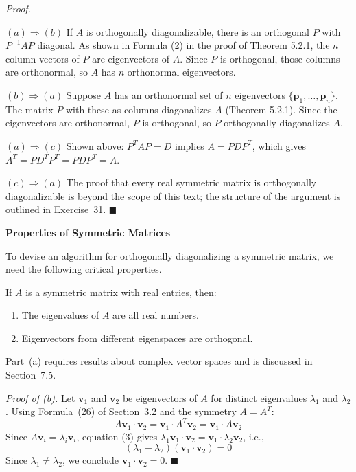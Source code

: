 \documentclass{article}
\newcommand{\redheading}[1]{{\vspace{2mm}\noindent\Large\bfseries\color{red!55!black} #1\par}\vspace{2mm}}
\theoremstyle{mystyle}
\begin{document}
\textit{Proof.}

\textbf{$(a)\Rightarrow(b)$} If $A$ is orthogonally diagonalizable, there is an orthogonal
$P$ with $P^{-1}AP$ diagonal. As shown in Formula (2) in the proof of Theorem 5.2.1, the
$n$ column vectors of $P$ are eigenvectors of $A$. Since $P$ is orthogonal, those columns
are orthonormal, so $A$ has $n$ orthonormal eigenvectors.

\textbf{$(b)\Rightarrow(a)$} Suppose $A$ has an orthonormal set of $n$ eigenvectors
$\{\mathbf{p}_1,\ldots,\mathbf{p}_n\}$. The matrix $P$ with these as columns diagonalizes
$A$ (Theorem 5.2.1). Since the eigenvectors are orthonormal, $P$ is orthogonal, so $P$
orthogonally diagonalizes $A$.

\textbf{$(a)\Rightarrow(c)$} Shown above: $P^T AP = D$ implies $A = PDP^T$, which gives
$A^T = PD^TP^T = PDP^T = A$.

\textbf{$(c)\Rightarrow(a)$} The proof that every real symmetric matrix is orthogonally
diagonalizable is beyond the scope of this text; the structure of the argument is outlined
in Exercise~31. $\blacksquare$

\redheading{Properties of Symmetric Matrices}

To devise an algorithm for orthogonally diagonalizing a symmetric matrix, we need the
following critical properties.

\begin{tcolorbox}[colback=red!4, colframe=red!60!black,
  title={\textbf{Theorem 7.2.2}}, boxrule=0.5mm, arc=3mm]
If $A$ is a symmetric matrix with real entries, then:
\begin{enumerate}
  \item[(a)] The eigenvalues of $A$ are all real numbers.
  \item[(b)] Eigenvectors from different eigenspaces are orthogonal.
\end{enumerate}
\end{tcolorbox}

Part~(a) requires results about complex vector spaces and is discussed in Section~7.5.

\textit{Proof of (b).} Let $\mathbf{v}_1$ and $\mathbf{v}_2$ be eigenvectors of $A$
for distinct eigenvalues $\lambda_1$ and $\lambda_2$. Using Formula~(26) of Section~3.2
and the symmetry $A = A^T$:
\begin{equation}
  A\mathbf{v}_1\cdot\mathbf{v}_2
  = \mathbf{v}_1\cdot A^T\mathbf{v}_2
  = \mathbf{v}_1\cdot A\mathbf{v}_2 \tag{3}
\end{equation}
Since $A\mathbf{v}_i = \lambda_i\mathbf{v}_i$, equation (3) gives
$\lambda_1\mathbf{v}_1\cdot\mathbf{v}_2 = \mathbf{v}_1\cdot\lambda_2\mathbf{v}_2$, i.e.,
\begin{equation}
  (\lambda_1 - \lambda_2)(\mathbf{v}_1\cdot\mathbf{v}_2) = 0 \tag{4}
\end{equation}
Since $\lambda_1\neq\lambda_2$, we conclude $\mathbf{v}_1\cdot\mathbf{v}_2 = 0$. $\blacksquare$
\end{document}
